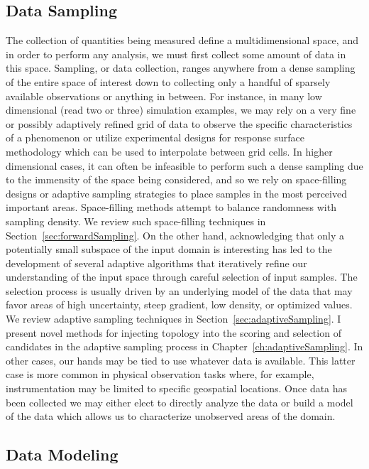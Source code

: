 \subsection{Data Sampling}

The collection of quantities being measured define a multidimensional space, and in order to perform any analysis, we must first collect some amount of data in this space.
%
Sampling, or data collection, ranges anywhere from a dense sampling of the entire space of interest down to collecting only a handful of sparsely available observations or anything in between.
%
For instance, in many low dimensional (read two or three) simulation examples, we may rely on a very fine or possibly adaptively refined grid of data to observe the specific characteristics of a phenomenon or utilize experimental designs for response surface methodology which can be used to interpolate between grid cells.
%
In higher dimensional cases, it can often be infeasible to perform such a dense sampling due to the immensity of the space being considered, and so we rely on space-filling designs or adaptive sampling strategies to place samples in the most perceived important areas.
%
Space-filling methods attempt to balance randomness with sampling density.
%
We review such space-filling techniques in Section~\ref{sec:forwardSampling}.
%
On the other hand, acknowledging that only a potentially small subspace of the input domain is interesting has led to the development of several adaptive algorithms that iteratively refine our understanding of the input space through careful selection of input samples.
%
The selection process is usually driven by an underlying model of the data that may favor areas of high uncertainty, steep gradient, low density, or optimized values.
%
We review adaptive sampling techniques in Section~\ref{sec:adaptiveSampling}.
%
I present novel methods for injecting topology into the scoring and selection of candidates in the adaptive sampling process in Chapter~\ref{ch:adaptiveSampling}.
%
In other cases, our hands may be tied to use whatever data is available.
%
This latter case is more common in physical observation tasks where, for example, instrumentation may be limited to specific geospatial locations.
%
Once data has been collected we may either elect to directly analyze the data or build a model of the data which allows us to characterize unobserved areas of the domain.

\subsection{Data Modeling}


